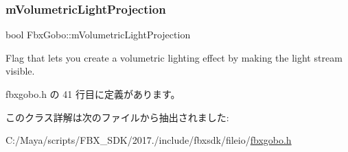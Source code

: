 \subsubsection{\texorpdfstring{m\+Volumetric\+Light\+Projection}{mVolumetricLightProjection}}
{\footnotesize\ttfamily bool Fbx\+Gobo\+::m\+Volumetric\+Light\+Projection}



Flag that lets you create a volumetric lighting effect by making the light stream visible. 



 fbxgobo.\+h の 41 行目に定義があります。



このクラス詳解は次のファイルから抽出されました\+:\begin{DoxyCompactItemize}
\item 
C\+:/\+Maya/scripts/\+F\+B\+X\+\_\+\+S\+D\+K/2017./include/fbxsdk/fileio/\hyperlink{fbxgobo_8h}{fbxgobo.\+h}\end{DoxyCompactItemize}
